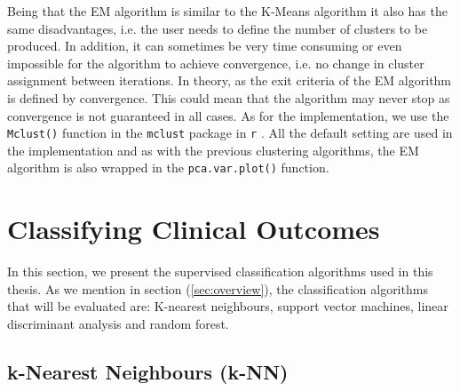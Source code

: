 \documentclass[../thesis.tex]{subfiles}
\begin{document}
\noindent Being that the EM algorithm is similar to the K-Means algorithm it also has the same disadvantages, i.e. the user needs to define the number of clusters to be produced. In addition, it can sometimes be very time consuming or even impossible for the algorithm to achieve convergence, i.e. no change in cluster assignment between iterations. In theory, as the exit criteria of the EM algorithm is defined by convergence. This could mean that the algorithm may never stop as convergence is not guaranteed in all cases. As for the implementation, we use the \texttt{Mclust()} function in the \texttt{mclust} package in \texttt{r} \citep{mclust}. All the default setting are used in the implementation and as with the previous clustering algorithms, the EM algorithm is also wrapped in the \texttt{pca.var.plot()} function. 

\section{Classifying Clinical Outcomes}
\label{sec:classify_clin_out}

\noindent In this section, we present the supervised classification algorithms used in this thesis. As we mention in section (\ref{sec:overview}), the classification algorithms that will be evaluated are: K-nearest neighbours, support vector machines, linear discriminant analysis and random forest.

\subsection{k-Nearest Neighbours (k-NN)}
\label{subsec:knn}
\end{document}
